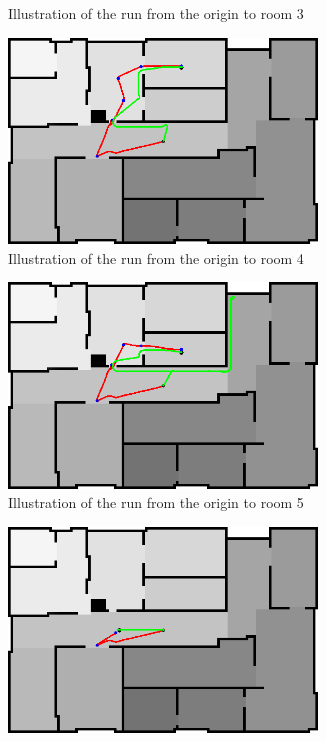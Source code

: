 \documentclass[../Head/Main.tex]{subfiles}
\begin{document}
\begin{figure}[H]
\begin{subfigure}[b]{0.49\textwidth}
    \caption{Illustration of the run from the origin to room 3}
    \label{fig:Test3}
  \end{subfigure}
  \hfill
  \begin{subfigure}[b]{0.49\textwidth}
    \centering
    \includegraphics[width=0.9\textwidth]{Modelbased_vs_Sensorbased/brushfireAndBugTest4}
    \caption{Illustration of the run from the origin to room 4}
    \label{fig:Test4}
  \end{subfigure}
  \hfill
  \begin{subfigure}[b]{0.49\textwidth}
    \centering
    \includegraphics[width=0.9\textwidth]{Modelbased_vs_Sensorbased/brushfireAndBugTest5}
    \caption{Illustration of the run from the origin to room 5}
    \label{fig:Test5}
  \end{subfigure}
  \hfill
  \begin{subfigure}[b]{0.49\textwidth}
    \centering
    \includegraphics[width=0.9\textwidth]{Modelbased_vs_Sensorbased/brushfireAndBugTest6}

\end{subfigure}
\end{figure}
\end{document}
